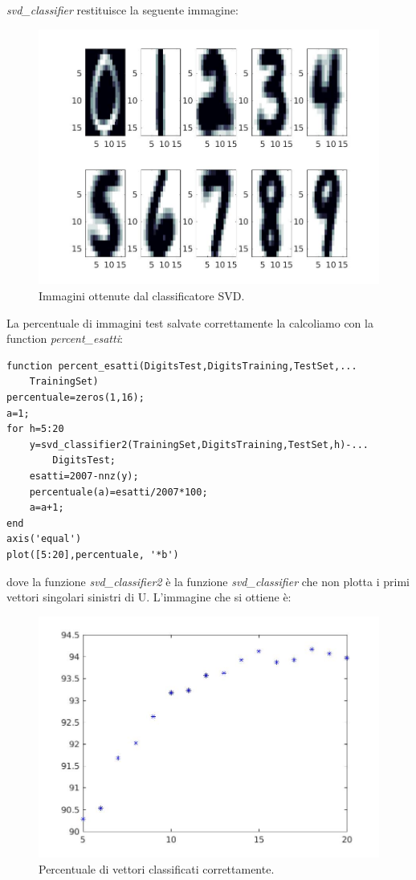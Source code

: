 \documentclass[11pt,a4paper,twoside,openright,titlepage,
                           headinclude,footinclude,BCOR5mm,
                           numbers=noenddot,cleardoublepage=empty,
                           tablecaptionabove]{scrbook}
\begin{document}
\emph{svd\_classifier} restituisce la seguente immagine:
\begin{figure}[h!]
\begin{center}
\includegraphics[width=\textwidth]{figs/svd_classifier.jpg}
\caption{Immagini ottenute dal classificatore SVD.}
\end{center}
\end{figure}
\par
La percentuale di immagini test salvate correttamente la calcoliamo con la function \emph{percent\_esatti}:
\begin{lstlisting}[frame=trBL]
function percent_esatti(DigitsTest,DigitsTraining,TestSet,...
    TrainingSet)
percentuale=zeros(1,16);
a=1;
for h=5:20
    y=svd_classifier2(TrainingSet,DigitsTraining,TestSet,h)-...
        DigitsTest;
    esatti=2007-nnz(y);
    percentuale(a)=esatti/2007*100;
    a=a+1;
end
axis('equal')
plot([5:20],percentuale, '*b')
\end{lstlisting}
dove la funzione \emph{svd\_classifier2} è la funzione \emph{svd\_classifier} che non plotta i primi vettori singolari sinistri di U. L'immagine che si ottiene è:
\begin{figure}[h!]
\begin{center}
\includegraphics[width=\textwidth]{figs/percentuale_esatti.jpg}
\caption{Percentuale di vettori classificati correttamente.}
\end{center}
\end{figure}
\end{document}

